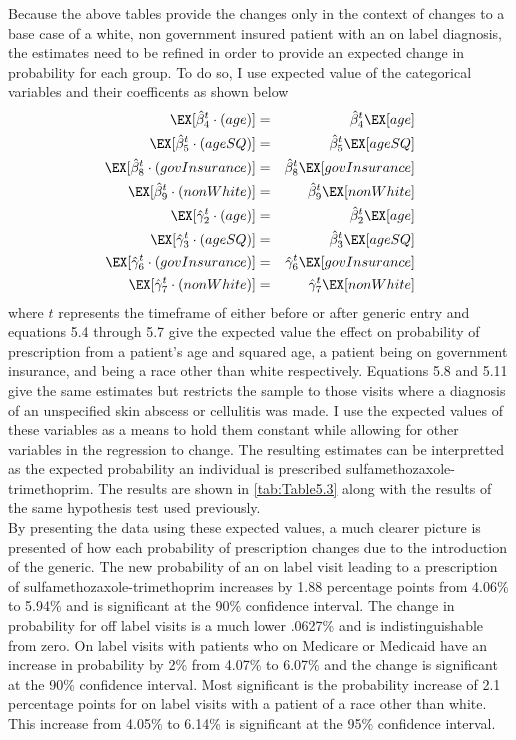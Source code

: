 
\newpage
Because the above tables provide the changes only in the context of changes to a base case of a white, non government insured patient with an on label diagnosis, the estimates need to be refined in order to provide an expected change in probability for each group. To do so, I use expected value of the categorical variables and their coefficents as shown below
\begin{eqnarray}
    \EX[\hat{\beta}_4^t\cdot(age)] &=& \hat{\beta}_4^t\EX[age]\\
    \EX[\hat{\beta}_5^t\cdot(ageSQ)] &=& \hat{\beta}_5^t\EX[ageSQ]\\
    \EX[\hat{\beta}_8^t\cdot(govInsurance)] &=& \hat{\beta}_8^t\EX[govInsurance]\\
    \EX[\hat{\beta}_9^t\cdot(nonWhite)] &=& \hat{\beta}_9^t\EX[nonWhite]\\
    \EX[\hat{\gamma}_2^t\cdot(age)] &=& \hat{\beta}_2^t\EX[age]\\
    \EX[\hat{\gamma}_3^t\cdot(ageSQ)] &=& \hat{\beta}_3^t\EX[ageSQ]\\
    \EX[\hat{\gamma}_6^t\cdot(govInsurance)] &=& \hat{\gamma}_6^t\EX[govInsurance]\\
    \EX[\hat{\gamma}_7^t\cdot(nonWhite)] &=& \hat{\gamma}_7^t\EX[nonWhite]
\end{eqnarray}
where $t$ represents the timeframe of either before or after generic entry and equations 5.4 through 5.7 give the expected value the effect on probability of prescription from a patient's age and squared age, a patient being on government insurance, and being a race other than white respectively. Equations 5.8 and 5.11 give the same estimates but restricts the sample to those visits where a diagnosis of an unspecified skin abscess or cellulitis was made. I use the expected values of these variables as a means to hold them constant while allowing for other variables in the regression to change. The resulting estimates can be interpretted as the expected probability an individual is prescribed sulfamethozaxole-trimethoprim. The results are shown in \autoref{tab:Table5.3} along with the results of the same hypothesis test used previously.\\
\indent By presenting the data using these expected values, a much clearer picture is presented of how each probability of prescription changes due to the introduction of the generic. The new probability of an on label visit leading to a prescription of sulfamethozaxole-trimethoprim increases by 1.88 percentage points from 4.06\% to 5.94\% and is significant at the 90\% confidence interval. The change in probability for off label visits is a much lower .0627\% and is indistinguishable from zero. On label visits with patients who on Medicare or Medicaid have an increase in probability by 2\% from 4.07\% to 6.07\% and the change is significant at the 90\% confidence interval. Most significant is the probability increase of 2.1 percentage points for on label visits with a patient of a race other than white. This increase from 4.05\% to 6.14\% is significant at the 95\% confidence interval.\\
